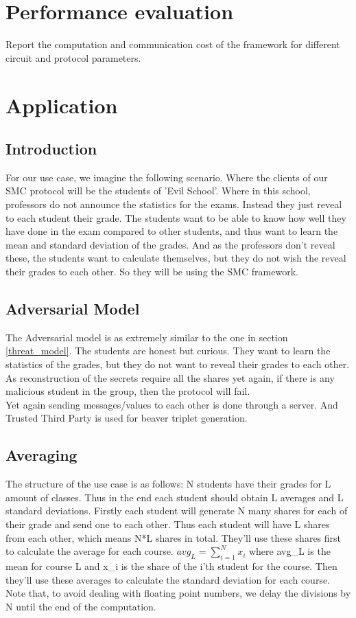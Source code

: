 \documentclass[10pt,conference,compsocconf]{IEEEtran}
\begin{document}
\section{Performance evaluation}
\label{perf_eval}
Report the computation and communication cost of the framework for different circuit and protocol parameters.

\section{Application}
\label{use_case}
\subsection{Introduction}
For our use case, we imagine the following scenario. Where the clients of our SMC protocol will be the students of 'Evil School'. Where in this school, professors do not announce the
statistics for the exams. Instead they just reveal to each student their grade. The students want to be able to know how well they have done in the exam compared to other students, and thus want to learn
the mean and standard deviation of the grades. And as the professors don't reveal these, the students want to calculate themselves, but they do not wish the reveal their grades to each other. So they will be using the SMC framework.
\\
\subsection{Adversarial Model}
The Adversarial model is as extremely similar to the one in section \ref{threat_model}.
The students are honest but curious. They want to learn the statistics of the grades, 
but they do not want to reveal their grades to each other. As reconstruction of the secrets require all the shares yet again,
if there is any malicious student in the group, then the protocol will fail.
\\
Yet again sending messages/values to each other is done through a server. And Trusted Third Party is used for beaver triplet generation.

\subsection{Averaging}
The structure of the use case is as follows: N students have their grades for L amount of classes. Thus in the end each student should obtain L averages and L standard deviations.
Firstly each student will generate N many shares for each of their grade and send one to each other. Thus each student will have L shares from each other, which means N*L shares in total. 
They'll use these shares first to calculate the average for each course. 
\begin{math}
{avg_L} = \sum_{i=1}^{N}x_i
\end{math}
where avg\_L is the mean for course L and x\_i is the share of the i'th student for the course. Then they'll use these averages to calculate the standard deviation for each course.
Note that, to avoid dealing with floating point numbers, we delay the divisions by N until the end of the computation.
\end{document}
